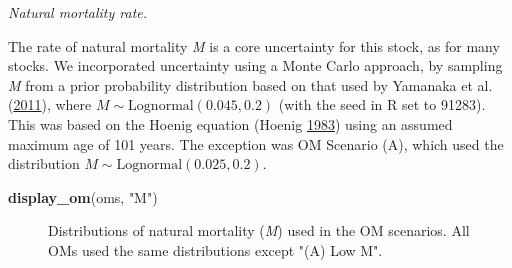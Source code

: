 \documentclass[11pt]{book}
\newenvironment{Shaded}{\begin{snugshade}}{\end{snugshade}}
\newcommand{\CommentTok}[1]{\textcolor[rgb]{0.56,0.35,0.01}{\textit{#1}}}
\newcommand{\DecValTok}[1]{\textcolor[rgb]{0.00,0.00,0.81}{#1}}
\newcommand{\FloatTok}[1]{\textcolor[rgb]{0.00,0.00,0.81}{#1}}
\newcommand{\KeywordTok}[1]{\textcolor[rgb]{0.13,0.29,0.53}{\textbf{#1}}}
\newcommand{\NormalTok}[1]{#1}
\newcommand{\OperatorTok}[1]{\textcolor[rgb]{0.81,0.36,0.00}{\textbf{#1}}}
\newcommand{\StringTok}[1]{\textcolor[rgb]{0.31,0.60,0.02}{#1}}
\begin{document}
\emph{Natural mortality rate.}

The rate of natural mortality \emph{M} is a core uncertainty for this stock, as for many stocks. We incorporated uncertainty using a Monte Carlo approach, by sampling \emph{M} from a prior probability distribution based on that used by Yamanaka et al. (\protect\hyperlink{ref-yamanaka2011}{2011}), where \(M \sim \textrm{Lognormal}(0.045, 0.2)\) (with the seed in R set to 91283). This was based on the Hoenig equation (Hoenig \protect\hyperlink{ref-hoenig1983}{1983}) using an assumed maximum age of 101 years. The exception was OM Scenario (A), which used the distribution \(M \sim \textrm{Lognormal}(0.025, 0.2)\).
\begin{Shaded}
\end{Shaded}
\begin{Shaded}
\begin{Highlighting}[]
\KeywordTok{display_om}\NormalTok{(oms, }\StringTok{"M"}\NormalTok{)}
\end{Highlighting}
\end{Shaded}
\begin{figure}[htb]

{\centering {} 

}

\caption{Distributions of natural mortality (\emph{M}) used in the OM scenarios. All OMs used the same distributions except "(A) Low M".}\label{fig:desc-stock-m-yelloweye}
\end{figure}
\label{app:desc-stock-h-yelloweye}
\end{document}
